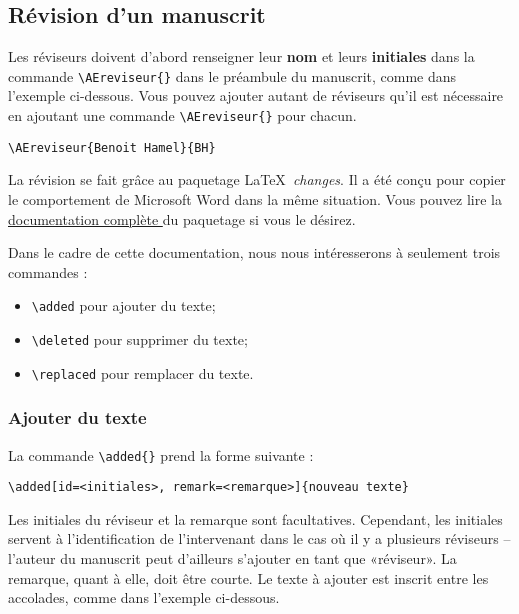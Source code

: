 \documentclass[french]{article}
\newcommand{\cmd}[1]{%
	\texttt{\textbackslash#1\{\}}
}
\newcommand{\dec}[1]{%
	\texttt{\textbackslash#1}
}
\newcommand{\lien}[2]{%
	\href{#1}{#2 \faIcon{external-link-alt}}
}
\begin{document}
		\subsection{Révision d'un manuscrit}
		
			Les réviseurs doivent d'abord renseigner leur \textbf{nom} et leurs \textbf{initiales} dans la commande
			\cmd{AEreviseur} dans le préambule du manuscrit, comme dans l'exemple ci-dessous. Vous pouvez ajouter autant
			de réviseurs qu'il est nécessaire en ajoutant une commande \cmd{AEreviseur} pour chacun.
			
			\begin{shaded*}
				\verb|\AEreviseur{Benoit Hamel}{BH}|
			\end{shaded*}
		
			La révision se fait grâce au paquetage \LaTeX\ \emph{changes}. Il a été conçu pour copier le comportement de Microsoft Word dans la même situation. Vous pouvez lire la
			\lien{http://mirrors.ctan.org/macros/latex/contrib/changes/changes.english.pdf}{documentation complète} du
			paquetage si vous le désirez. 
			
			Dans le cadre de cette documentation, nous nous intéresserons à seulement trois commandes :
			
			\begin{itemize}
				\item \dec{added} pour ajouter du texte;
				\item \dec{deleted} pour supprimer du texte;
				\item \dec{replaced} pour remplacer du texte.
			\end{itemize}
		
			\subsubsection{Ajouter du texte}
			
				La commande \cmd{added} prend la forme suivante :
				
				\begin{shaded*}
					\verb|\added[id=<initiales>, remark=<remarque>]{nouveau texte}|
				\end{shaded*}
			
				Les initiales du réviseur et la remarque sont facultatives. Cependant, les initiales servent à l'identification
				de l'intervenant dans le cas où il y a plusieurs réviseurs -- l'auteur du manuscrit peut d'ailleurs s'ajouter en
				tant que «réviseur». La remarque, quant à elle, doit être courte. Le texte à ajouter est inscrit entre les accolades, comme dans l'exemple ci-dessous.
				
\end{document}
